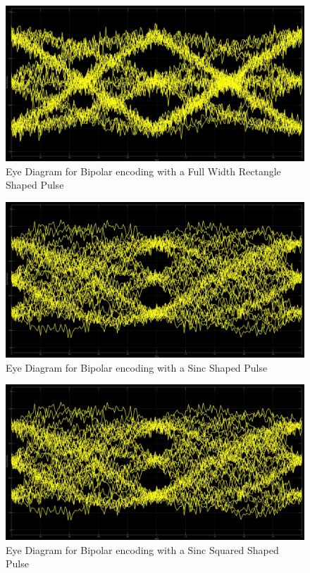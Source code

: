 \documentclass{article}
\begin{document}
\begin{figure}[H]
  \includegraphics[width = \linewidth]{BP_Sin_Eye.jpg}
  \caption{Eye Diagram for Bipolar encoding with a Full Width Rectangle Shaped Pulse}
  \label{fig:BP-Sin-Eye}
\end{figure}
\begin{figure}[H]
  \includegraphics[width = \linewidth]{BP_Sinc_Eye.jpg}
  \caption{Eye Diagram for Bipolar encoding with a Sinc Shaped Pulse}
  \label{fig:BP-Sinc-Eye}
\end{figure}
\begin{figure}[H]
  \includegraphics[width = \linewidth]{BP_Squared_Eye.jpg}
  \caption{Eye Diagram for Bipolar encoding with a Sinc Squared Shaped Pulse}
  \label{fig:BP-Squared-Eye}
\end{figure}
\end{document}
